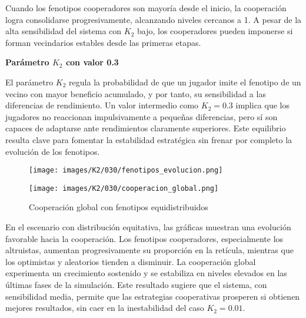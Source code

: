 \documentclass[a4paper,12pt]{report}
\begin{document}
Cuando los fenotipos cooperadores son mayoría desde el inicio, la cooperación logra consolidarse progresivamente, alcanzando niveles cercanos a 1. A pesar de la alta sensibilidad del sistema con \(K_2\) bajo, los cooperadores pueden imponerse si forman vecindarios estables desde las primeras etapas.

\newpage

\vspace{1.5em}
\noindent\textbf{Parámetro \( K_2 \) con valor 0.3}
\vspace{0.5em}

El parámetro \( K_2 \) regula la probabilidad de que un jugador imite el fenotipo de un vecino con mayor beneficio acumulado, y por tanto, su sensibilidad a las diferencias de rendimiento. Un valor intermedio como \( K_2 = 0.3 \) implica que los jugadores no reaccionan impulsivamente a pequeñas diferencias, pero sí son capaces de adaptarse ante rendimientos claramente superiores. Este equilibrio resulta clave para fomentar la estabilidad estratégica sin frenar por completo la evolución de los fenotipos.

\begin{figure}[h!]
    \centering
    \begin{minipage}{0.49\textwidth}
    \centering
    \texttt{[image: images/K2/030/fenotipos\_evolucion.png]}
    \label{fig:enter-label}
    \end{minipage}
    \hfill
    \begin{minipage}{0.49\textwidth}
    \centering
    \texttt{[image: images/K2/030/cooperacion\_global.png]}
    \label{fig:enter-label}
    \end{minipage}
    \caption{Cooperación global con fenotipos equidistribuidos}
\end{figure}

En el escenario con distribución equitativa, las gráficas muestran una evolución favorable hacia la cooperación. Los fenotipos cooperadores, especialmente los altruistas, aumentan progresivamente su proporción en la retícula, mientras que los optimistas y aleatorios tienden a disminuir. La cooperación global experimenta un crecimiento sostenido y se estabiliza en niveles elevados en las últimas fases de la simulación. Este resultado sugiere que el sistema, con sensibilidad media, permite que las estrategias cooperativas prosperen si obtienen mejores resultados, sin caer en la inestabilidad del caso \( K_2 = 0.01 \).

\newpage
\end{document}
